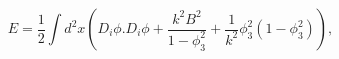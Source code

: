 \begin{equation}\label{energeq} E=\frac{1}{2}\int d^2x \left( D_i \phi . D_i \phi
+\frac{k^2B^2}{1-\phi_3^2}+\frac{1}{k^2}\phi_3^2(1-\phi_3^2)\right),
\end{equation} 
